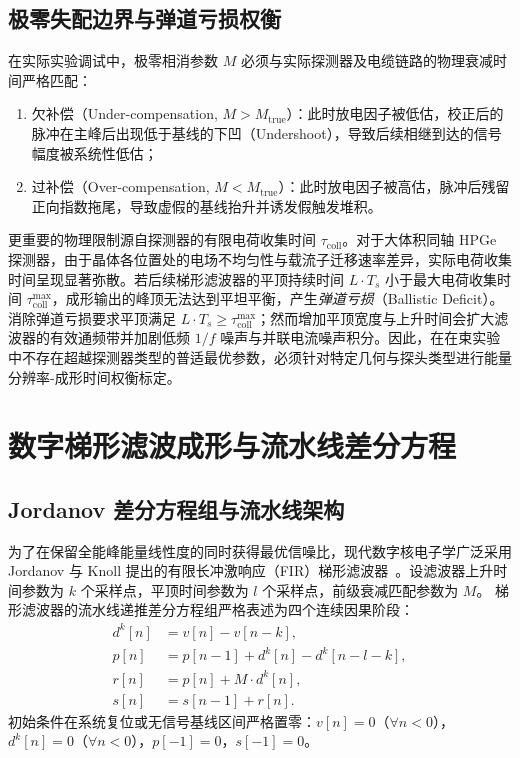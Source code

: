 \subsection{极零失配边界与弹道亏损权衡}

在实际实验调试中，极零相消参数 $M$ 必须与实际探测器及电缆链路的物理衰减时间严格匹配：
\begin{enumerate}
\item 欠补偿（Under-compensation, $M > M_{\mathrm{true}}$）：此时放电因子被低估，校正后的脉冲在主峰后出现低于基线的下凹（Undershoot），导致后续相继到达的信号幅度被系统性低估；
\item 过补偿（Over-compensation, $M < M_{\mathrm{true}}$）：此时放电因子被高估，脉冲后残留正向指数拖尾，导致虚假的基线抬升并诱发假触发堆积。
\end{enumerate}

更重要的物理限制源自探测器的有限电荷收集时间 $\tau_{\mathrm{coll}}$。对于大体积同轴 HPGe 探测器，由于晶体各位置处的电场不均匀性与载流子迁移速率差异，实际电荷收集时间呈现显著弥散。若后续梯形滤波器的平顶持续时间 $L \cdot T_s$ 小于最大电荷收集时间 $\tau_{\mathrm{coll}}^{\max}$，成形输出的峰顶无法达到平坦平衡，产生\emph{弹道亏损}（Ballistic Deficit）。
消除弹道亏损要求平顶满足 $L \cdot T_s \ge \tau_{\mathrm{coll}}^{\max}$；然而增加平顶宽度与上升时间会扩大滤波器的有效通频带并加剧低频 $1/f$ 噪声与并联电流噪声积分。因此，在在束实验中不存在超越探测器类型的普适最优参数，必须针对特定几何与探头类型进行能量分辨率-成形时间权衡标定。

\section{数字梯形滤波成形与流水线差分方程}\label{sec:appE-trapezoid}

\subsection{Jordanov 差分方程组与流水线架构}

为了在保留全能峰能量线性度的同时获得最优信噪比，现代数字核电子学广泛采用 Jordanov 与 Knoll 提出的有限长冲激响应（FIR）梯形滤波器~\cite{wu-hongyi-2020-general-purpose-digital-daq-thesis}。设滤波器上升时间参数为 $k$ 个采样点，平顶时间参数为 $l$ 个采样点，前级衰减匹配参数为 $M$。
梯形滤波器的流水线递推差分方程组严格表述为四个连续因果阶段：
\begin{align}
d^k[n] &= v[n] - v[n-k], \label{eq:appE-trap-dk} \\
p[n] &= p[n-1] + d^k[n] - d^k[n-l-k], \label{eq:appE-trap-pn} \\
r[n] &= p[n] + M \cdot d^k[n], \label{eq:appE-trap-rn} \\
s[n] &= s[n-1] + r[n]. \label{eq:appE-trap-sn}
\end{align}
初始条件在系统复位或无信号基线区间严格置零：$v[n] = 0$（$\forall n < 0$），$d^k[n] = 0$（$\forall n < 0$），$p[-1] = 0$，$s[-1] = 0$。

